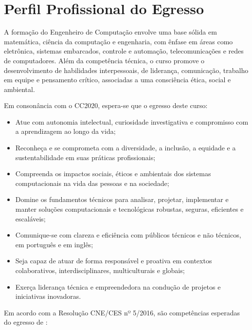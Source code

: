 \chapter{Perfil Profissional do Egresso}

A formação do Engenheiro de Computação envolve uma base sólida em matemática, ciência da computação e engenharia, com ênfase em áreas como eletrônica, sistemas embarcados, controle e automação, telecomunicações e redes de computadores. Além da competência técnica, o curso promove o desenvolvimento de habilidades interpessoais, de liderança, comunicação, trabalho em equipe e pensamento crítico, associadas a uma consciência ética, social e ambiental.

Em consonância com o CC2020, espera-se que o egresso deste curso:

\begin{itemize}
    \item Atue com autonomia intelectual, curiosidade investigativa e compromisso com a aprendizagem ao longo da vida;
    \item Reconheça e se comprometa com a diversidade, a inclusão, a equidade e a sustentabilidade em suas práticas profissionais;
    \item Compreenda os impactos sociais, éticos e ambientais dos sistemas computacionais na vida das pessoas e na sociedade;
    \item Domine os fundamentos técnicos para analisar, projetar, implementar e manter soluções computacionais e tecnológicas robustas, seguras, eficientes e escaláveis;
    \item Comunique-se com clareza e eficiência com públicos técnicos e não técnicos, em português e em inglês;
    \item Seja capaz de atuar de forma responsável e proativa em contextos colaborativos, interdisciplinares, multiculturais e globais;
    \item Exerça liderança técnica e empreendedora na condução de projetos e iniciativas inovadoras.
\end{itemize}

Em acordo com a Resolução CNE/CES nº 5/2016, são competências esperadas do egresso de \ppccurso:

